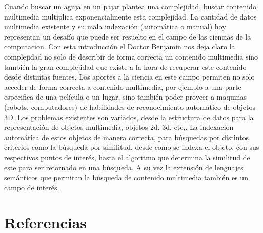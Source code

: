 \documentclass[12pt,letterpaper]{article}
\begin{document}
Cuando buscar un aguja en un pajar plantea una complejidad, buscar contenido multimedia multiplica exponencialmente esta complejidad. La cantidad de datos multimedia existente y su mala indexación (automática o manual) hoy representan un desafío que puede ser resuelto en el campo de las ciencias de la computacion. Con esta introducción el Doctor Benjamin nos deja claro la complejidad no solo de describir de forma correcta un contenido multimedia sino también la gran complejidad que existe a la hora de recuperar este contenido desde distintas fuentes. Los aportes a la ciencia en este campo permiten no solo acceder de forma correcta a contenido multimedia, por ejemplo a una parte especifica de una película o un lugar, sino también poder proveer a maquinas (robots, computadores)  de habilidades de reconocimiento automático de objetos 3D.
Los problemas existentes son variados, desde la estructura de datos para la representación de objetos multimedia, objetos 2d, 3d, etc,. La indexación  automática de estos objetos de manera correcta, para búsquedas por distintos criterios como la búsqueda por similitud, desde como se indexa el objeto, con sus respectivos puntos de interés, hasta el algoritmo que determina la similitud de este para ser retornado en una búsqueda. A su vez la extensión de lenguajes semánticos que permitan la búsqueda de contenido multimedia también es un campo de interés.




\section{Referencias\label{sec:references}}

\printbibliography[heading=none]
\end{document}

